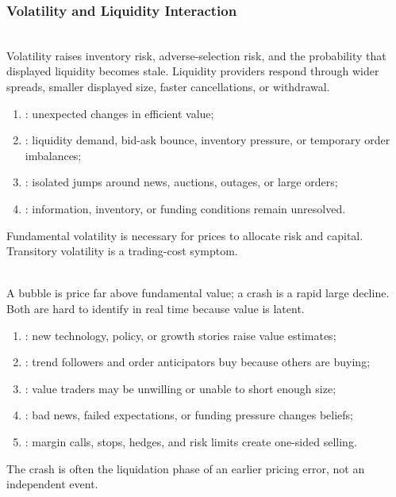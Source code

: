 \subsubsection{Volatility and Liquidity Interaction}

\begin{principle} \\
Volatility raises inventory risk, adverse-selection risk, and the probability that displayed liquidity becomes stale. Liquidity providers respond through wider spreads, smaller displayed size, faster cancellations, or withdrawal.
\end{principle}

\begin{taxonomy} 
\begin{enumerate}[label=\roman*.]
\setlength{\itemsep}{0pt}
\item {}: unexpected changes in efficient value;
\item {}: liquidity demand, bid-ask bounce, inventory pressure, or temporary order imbalances;
\item {}: isolated jumps around news, auctions, outages, or large orders;
\item {}: information, inventory, or funding conditions remain unresolved.
\end{enumerate}
Fundamental volatility is necessary for prices to allocate risk and capital.\\
Transitory volatility is a trading-cost symptom.
\end{taxonomy}

\begin{definition} \\
A bubble is price far above fundamental value; a crash is a rapid large decline. Both are hard to identify in real time because value is latent.
\end{definition}

\begin{taxonomy} 
\begin{enumerate}[label=\roman*.]
\setlength{\itemsep}{0pt}
\item {}: new technology, policy, or growth stories raise value estimates;
\item {}: trend followers and order anticipators buy because others are buying;
\item {}: value traders may be unwilling or unable to short enough size;
\item {}: bad news, failed expectations, or funding pressure changes beliefs;
\item {}: margin calls, stops, hedges, and risk limits create one-sided selling.
\end{enumerate}
The crash is often the liquidation phase of an earlier pricing error, not an independent event.
\end{taxonomy}

